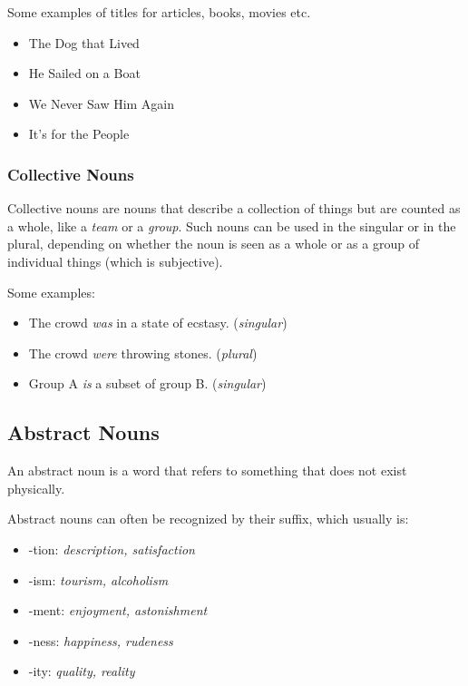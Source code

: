 Some examples of titles for articles, books, movies etc.
\begin{itemize}
    \item The Dog that Lived
    \item He Sailed on a Boat
    \item We Never Saw Him Again
    \item It's for the People
\end{itemize}

\subsubsection{Collective Nouns}
\begin{definition}
    Collective nouns are nouns that describe a collection of things but are counted as a whole, like a \textit{team} or a \textit{group}. Such nouns can be used in the singular or in the plural, depending on whether the noun is seen as a whole or as a group of individual things (which is subjective).
\end{definition}
\label{Collective Nouns}

Some examples:
\begin{itemize}
    \item The crowd \textit{was} in a state of ecstasy. (\textit{singular})
    \item The crowd \textit{were} throwing stones. (\textit{plural})
    \item Group A \textit{is} a subset of group B. (\textit{singular})
\end{itemize}

\newpage
\subsection{Abstract Nouns}
\begin{definition}
    An abstract noun is a word that refers to something that does not exist physically.
\end{definition}
Abstract nouns can often be recognized by their suffix, which usually is:
\begin{itemize}
    \item -tion: \textit{description, satisfaction}
    \item -ism: \textit{tourism, alcoholism}
    \item -ment: \textit{enjoyment, astonishment}
    \item -ness: \textit{happiness, rudeness}
    \item -ity: \textit{quality, reality}
\end{itemize}

